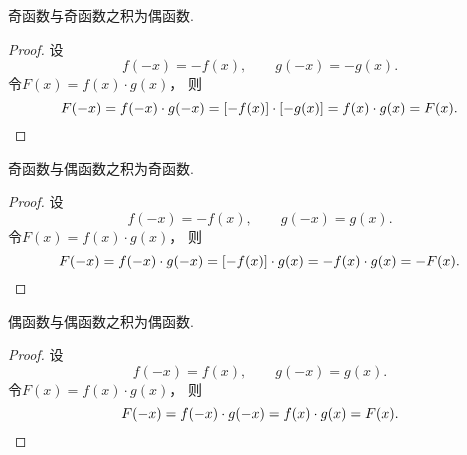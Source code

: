 \begin{property}
奇函数与奇函数之积为偶函数.
\begin{proof}
设\begin{equation*}
	f(-x) = -f(x),
	\qquad
	g(-x) = -g(x).
\end{equation*}
令\(F(x) = f(x) \cdot g(x)\)，
则\begin{equation*}
	F(-x) = f(-x) \cdot g(-x)
	= [-f(x)] \cdot [-g(x)]
	= f(x) \cdot g(x)
	= F(x).
	\qedhere
\end{equation*}
\end{proof}
\end{property}

\begin{property}
奇函数与偶函数之积为奇函数.
\begin{proof}
设\begin{equation*}
	f(-x) = -f(x),
	\qquad
	g(-x) = g(x).
\end{equation*}
令\(F(x) = f(x) \cdot g(x)\)，
则\begin{equation*}
	F(-x) = f(-x) \cdot g(-x)
	= [-f(x)] \cdot g(x)
	= - f(x) \cdot g(x)
	= - F(x).
	\qedhere
\end{equation*}
\end{proof}
\end{property}

\begin{property}
偶函数与偶函数之积为偶函数.
\begin{proof}
设\begin{equation*}
	f(-x) = f(x),
	\qquad
	g(-x) = g(x).
\end{equation*}
令\(F(x) = f(x) \cdot g(x)\)，
则\begin{equation*}
	F(-x) = f(-x) \cdot g(-x)
	= f(x) \cdot g(x)
	= F(x).
	\qedhere
\end{equation*}
\end{proof}
\end{property}

